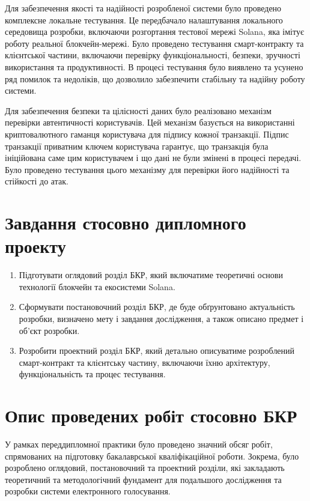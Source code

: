 \documentclass[14pt]{extreport}
\begin{document}
Для забезпечення якості та надійності розробленої системи було проведено комплексне локальне тестування. Це передбачало налаштування локального середовища розробки, включаючи розгортання тестової мережі Solana, яка імітує роботу реальної блокчейн-мережі. Було проведено тестування смарт-контракту та клієнтської частини, включаючи перевірку функціональності, безпеки, зручності використання та продуктивності. В процесі тестування було виявлено та усунено ряд помилок та недоліків, що дозволило забезпечити стабільну та надійну роботу системи.

Для забезпечення безпеки та цілісності даних було реалізовано механізм перевірки автентичності користувачів. Цей механізм базується на використанні криптовалютного гаманця користувача для підпису кожної транзакції. Підпис транзакції приватним ключем користувача гарантує, що транзакція була ініційована саме цим користувачем і що дані не були змінені в процесі передачі. Було проведено тестування цього механізму для перевірки його надійності та стійкості до атак.

\section{Завдання стосовно дипломного проекту}

\begin{enumerate}
	\item Підготувати оглядовий розділ БКР, який включатиме теоретичні основи технології блокчейн та екосистеми Solana.
  \item Сформувати постановочний розділ БКР, де буде обґрунтовано актуальність розробки, визначено мету і завдання дослідження, а також описано предмет і об'єкт розробки.
  \item Розробити проектний розділ БКР, який детально описуватиме розроблений смарт-контракт та клієнтську частину, включаючи їхню архітектуру, функціональність та процес тестування.
\end{enumerate}

\section{Опис проведених робіт стосовно БКР}

У рамках переддипломної практики було проведено значний обсяг робіт, спрямованих на підготовку бакалаврської кваліфікаційної роботи. Зокрема, було розроблено оглядовий, постановочний та проектний розділи, які закладають теоретичний та методологічний фундамент для подальшого дослідження та розробки системи електронного голосування.
\end{document}
